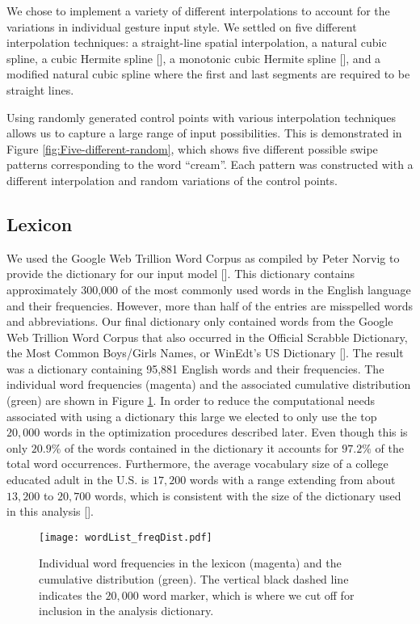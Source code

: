 \documentclass[final,1p,times,authoryear]{elsarticle}
\begin{document}
We chose to implement a variety of different interpolations to account
for the variations in individual gesture input style. We settled on five
different interpolation techniques: a straight-line spatial interpolation,
a natural cubic spline, a cubic Hermite spline [\cite{Splines}], a monotonic cubic
Hermite spline [\cite{MonotonicSplines}], and a modified natural cubic spline where the first
and last segments are required to be straight lines.

Using randomly generated control points with various interpolation
techniques allows us to capture a large range of input possibilities.
This is demonstrated in Figure \ref{fig:Five-different-random}, which
shows five different possible swipe patterns corresponding to the
word ``cream''. Each pattern was constructed with a different interpolation
and random variations of the control points.


\subsection{Lexicon\label{sub:Word-Corpus}}
We used the Google Web Trillion Word Corpus as compiled by Peter Norvig
to provide the dictionary for our input model [\cite{Norvig:Misc}].
This dictionary contains approximately 300,000 of the most commonly
used words in the English language and their frequencies. However,
more than half of the entries are misspelled words and abbreviations.
Our final dictionary only contained words from the Google Web Trillion
Word Corpus that also occurred in the Official Scrabble Dictionary,
the Most Common Boys/Girls Names, or WinEdt\textquoteright s US Dictionary
[\cite{Scrabble:Ward,WinEdit:Wordlist}]. The result was a dictionary
containing 95,881 English words and their frequencies. The individual
word frequencies (magenta) and the associated cumulative distribution
(green) are shown in Figure \ref{fig:Individual-word-frequencies}.
In order to reduce the computational needs associated with using a
dictionary this large we elected to only use the top $20,000$ words
in the optimization procedures described later. Even though this is
only $20.9\%$ of the words contained in the dictionary it accounts
for $97.2\%$ of the total word occurrences. Furthermore, the average
vocabulary size of a college educated adult in the U.S. is $17,200$
words with a range extending from about $13,200$ to $20,700$ words,
which is consistent with the size of the dictionary used in this analysis [\cite{GOULDEN1990}].

\begin{figure}[tp!]
\begin{centering}
\texttt{[image: wordList\_freqDist.pdf]}
\par\end{centering}
\smallskip{}
\protect\caption{Individual word frequencies in the lexicon (magenta) and the cumulative
distribution (green). The vertical black dashed line indicates the
$20,000$ word marker, which is where we cut off for inclusion in
the analysis dictionary.\label{fig:Individual-word-frequencies}}
\end{figure}
\end{document}
